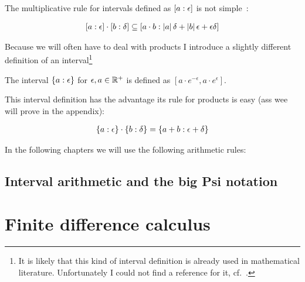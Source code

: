 The multiplicative rule for intervals defined as $\an{a}$ is not simple~\cite[p.~22]{kulla}:

\begin{align}
  \an[\epsilon]{a} \cdot \an[\delta]{b} \subseteq \an[\abs{a}\delta+\abs{b}\epsilon+\epsilon\delta]{a\cdot b}
\end{align}

Because we will often have to deal with products I introduce a slightly different definition of an interval\footnote{It is likely that this kind of interval definition is already used in mathematical literature. Unfortunately I could not find a reference for it, cf.~\cite{tampis:ean}.}

\begin{definition}
  The interval $\ean{a}$ for $\epsilon,a\in\Rplus$ is defined as $\left[a\cdot e^{-\epsilon},a\cdot e^\epsilon\right]$.
\end{definition}

This interval definition has the advantage its rule for products is easy (ass wee will prove in the appendix):

\begin{align}
  \ean[\epsilon]{a}\cdot \ean[\delta]{b} = \ean[\epsilon+\delta]{a+b}
\end{align}

\noindent In the following chapters we will use the following arithmetic rules:



\subsection{Interval arithmetic and the big Psi notation}

\section{Finite difference calculus}

